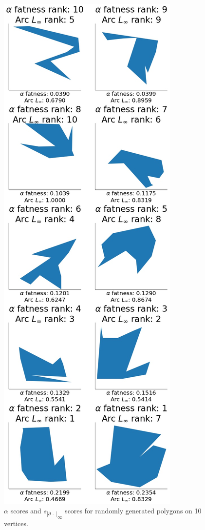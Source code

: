\documentclass[]{jocg}
\newcommand{\abs}[1]{|#1|}
\newcommand{\chordarc}{{s_{\abs{\partial~\cdot~}}}}
\theoremstyle{definition}
\theoremstyle{remark}
\begin{document}
\begin{figure}[t]
  \centering
  \includegraphics[height=0.8\textheight]{../plots/u_10_alpha_score_chord_arc_infinity_vertices_0-05_delta_ranking.jpg}
  \caption{$\alpha$ scores and ${\chordarc}_{\infty}$ scores for randomly
  generated polygons on 10 vertices.}
  \label{fig:alph-inft-10}
\end{figure}
\end{document}
